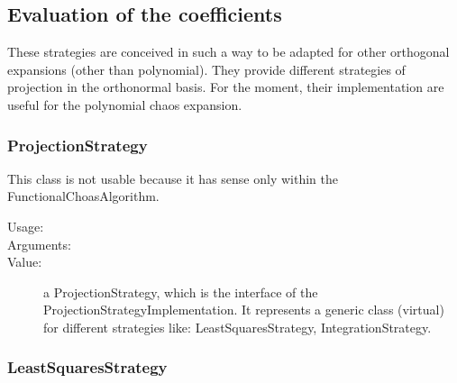 \newpage
\subsection{Evaluation of the coefficients}

These strategies are conceived in such a way to be adapted for other orthogonal expansions (other than polynomial). They provide different strategies of projection in the orthonormal basis. For the moment, their implementation are useful for the polynomial chaos expansion.

\subsubsection{ProjectionStrategy}

This class is not usable because it has sense only within the FunctionalChoasAlgorithm.


\begin{description}
\item[Usage:] \rule{0pt}{1em}

\item[Arguments:]  \rule{0pt}{1em}

\item[Value:]  a ProjectionStrategy, which is the interface of the ProjectionStrategyImplementation. It represents a generic class (virtual) for different strategies like: LeastSquaresStrategy, IntegrationStrategy.

\end{description}


\newpage
\subsubsection{LeastSquaresStrategy}

